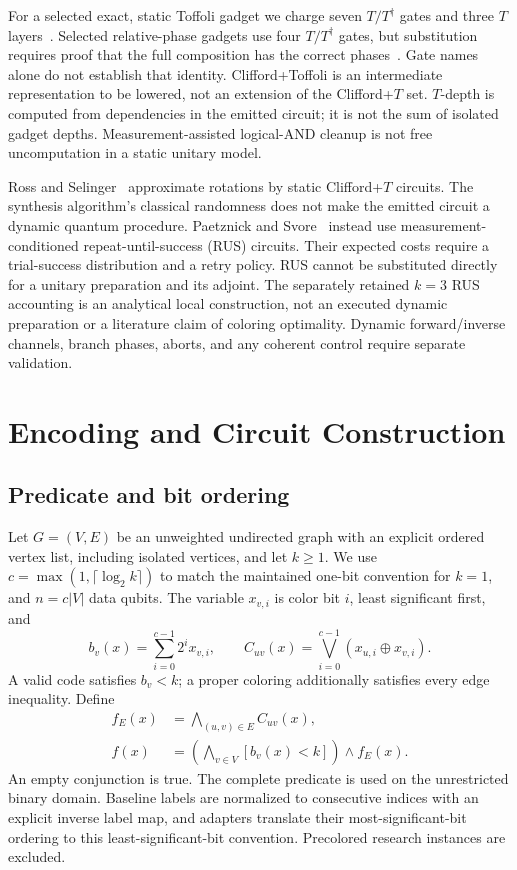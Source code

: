 \documentclass[sigconf, natbib]{acmart}
\begin{document}
For a selected exact, static Toffoli gadget we charge seven $T/T^\dagger$ gates and three $T$ layers~\cite{Tcount}. Selected relative-phase gadgets use four $T/T^\dagger$ gates, but substitution requires proof that the full composition has the correct phases~\cite{Maslov2016}. Gate names alone do not establish that identity. Clifford+Toffoli is an intermediate representation to be lowered, not an extension of the Clifford+$T$ set. $T$-depth is computed from dependencies in the emitted circuit; it is not the sum of isolated gadget depths. Measurement-assisted logical-AND cleanup is not free uncomputation in a static unitary model.

Ross and Selinger~\cite{RossSelinger} approximate rotations by static Clifford+$T$ circuits. The synthesis algorithm's classical randomness does not make the emitted circuit a dynamic quantum procedure. Paetznick and Svore~\cite{PaetznickSvore} instead use measurement-conditioned repeat-until-success (RUS) circuits. Their expected costs require a trial-success distribution and a retry policy. RUS cannot be substituted directly for a unitary preparation and its adjoint. The separately retained $k=3$ RUS accounting is an analytical local construction, not an executed dynamic preparation or a literature claim of coloring optimality. Dynamic forward/inverse channels, branch phases, aborts, and any coherent control require separate validation.

\section{Encoding and Circuit Construction}
\label{section:hls-flow}
\subsection{Predicate and bit ordering}
\label{subsec:encoding}
Let $G=(V,E)$ be an unweighted undirected graph with an explicit ordered vertex list, including isolated vertices, and let $k\geq1$. We use $c=\max(1,\lceil\log_2 k\rceil)$ to match the maintained one-bit convention for $k=1$, and $n=c|V|$ data qubits. The variable $x_{v,i}$ is color bit $i$, least significant first, and
\begin{equation}
 b_v(x)=\sum_{i=0}^{c-1}2^i x_{v,i},\qquad
 C_{uv}(x)=\bigvee_{i=0}^{c-1}(x_{u,i}\oplus x_{v,i}).
\end{equation}
A valid code satisfies $b_v<k$; a proper coloring additionally satisfies every edge inequality. Define
\begin{align}
 f_E(x)&=\bigwedge_{(u,v)\in E}C_{uv}(x),\\
 f(x)&=\left(\bigwedge_{v\in V}[b_v(x)<k]\right)\land f_E(x).
 \label{eq:complete-predicate}
\end{align}
An empty conjunction is true. The complete predicate is used on the unrestricted binary domain. Baseline labels are normalized to consecutive indices with an explicit inverse label map, and adapters translate their most-significant-bit ordering to this least-significant-bit convention. Precolored research instances are excluded.
\end{document}
